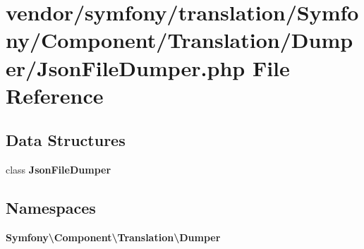 \section{vendor/symfony/translation/\+Symfony/\+Component/\+Translation/\+Dumper/\+Json\+File\+Dumper.php File Reference}
\label{_json_file_dumper_8php}
\subsection*{Data Structures}
\begin{DoxyCompactItemize}
\item 
class {\bf Json\+File\+Dumper}
\end{DoxyCompactItemize}
\subsection*{Namespaces}
\begin{DoxyCompactItemize}
\item 
 {\bf Symfony\textbackslash{}\+Component\textbackslash{}\+Translation\textbackslash{}\+Dumper}
\end{DoxyCompactItemize}
